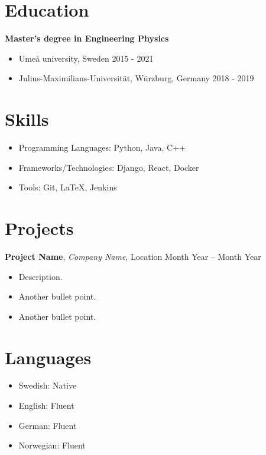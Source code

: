 \documentclass[11pt, a4paper]{article}
\begin{document}
\section*{Education}
\textbf{Master's degree in Engineering Physics}
\begin{itemize}[noitemsep]
    \item Umeå university, Sweden \hfill 2015 - 2021
    \item Julius-Maximilians-Universität, Würzburg, Germany \hfill 2018 - 2019
\end{itemize}

\section*{Skills}
\begin{itemize}[noitemsep]
    \item Programming Languages: Python, Java, C++
    \item Frameworks/Technologies: Django, React, Docker
    \item Tools: Git, LaTeX, Jenkins
\end{itemize}

\section*{Projects}
\textbf{Project Name}, \textit{Company Name}, Location \hfill Month Year – Month Year
\begin{itemize}[noitemsep]
    \item Description.
    \item Another bullet point.
    \item Another bullet point.
\end{itemize}

\section*{Languages}
\begin{itemize}[noitemsep]
    \item Swedish: Native
    \item English: Fluent
    \item German: Fluent
    \item Norwegian: Fluent
\end{itemize}
\end{document}
